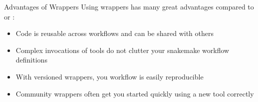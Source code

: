 \begin{frame}{Advantages of Wrappers}
    Using wrappers has many great advantages compared to  or :
    \begin{itemize}[<+->]
        \item Code is reusable across workflows and can be shared with others
        \item Complex invocations of tools do not clutter your snakemake workflow definitions
        \item With versioned wrappers, you workflow is easily reproducible
        \item Community wrappers often get you started quickly using a new tool correctly
    \end{itemize}
\end{frame}
